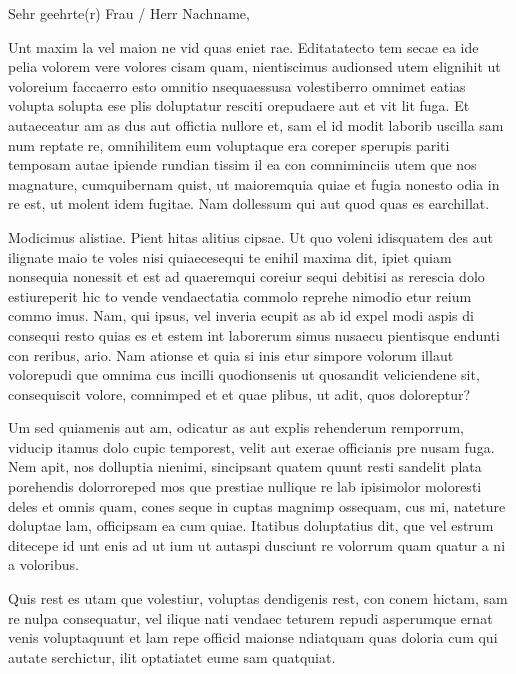 \documentclass[english]{ethbrief3}
\begin{document}

    \opening{Sehr geehrte(r) Frau / Herr Nachname,}

    Unt maxim la vel maion ne vid quas eniet rae. Editatatecto tem secae ea ide pelia volorem vere volores cisam quam, nientiscimus audionsed utem elignihit ut voloreium faccaerro esto omnitio nsequaessusa vole\-sti\-berro omnimet eatias volupta solupta ese plis doluptatur resciti orepudaere aut et vit lit fuga. Et autaeceatur am as dus aut offictia nullore et, sam el id modit laborib uscilla sam num reptate re, omnihilitem eum voluptaque era coreper sperupis pariti temposam autae ipiende rundian tissim il ea con comniminciis utem que nos magnature, cumquibernam quist, ut maioremquia quiae et fugia nonesto odia in re est, ut molent idem fugitae. Nam dollessum qui aut quod quas es earchillat.

    Modicimus alistiae. Pient hitas alitius cipsae. Ut quo voleni idisquatem des aut ilignate maio te voles nisi quiaecesequi te enihil maxima dit, ipiet quiam nonsequia nonessit et est ad quaeremqui coreiur sequi debitisi as rerescia dolo estiureperit hic to vende vendaectatia commolo reprehe nimodio etur reium commo imus. Nam, qui ipsus, vel inveria ecupit as ab id expel modi aspis di consequi resto quias es et estem int laborerum simus nusaecu pientisque endunti con reribus, ario. Nam ationse et quia si inis etur simpore volorum illaut volorepudi que omnima cus incilli quodionsenis ut quosandit veliciendene sit, consequiscit volore, comnimped et et quae plibus, ut adit, quos doloreptur?

    Um sed quiamenis aut am, odicatur as aut explis rehenderum remporrum, viducip itamus dolo cupic temporest, velit aut exerae officianis pre nusam fuga. Nem apit, nos dolluptia nienimi, sincipsant quatem quunt resti sandelit plata porehendis dolorroreped mos que prestiae nullique re lab ipisimolor moloresti deles et omnis quam, cones seque in cuptas magnimp ossequam, cus mi, nateture doluptae lam, officipsam ea cum quiae. Itatibus doluptatius dit, que vel estrum ditecepe id unt enis ad ut ium ut autaspi dusciunt re volorrum quam quatur a ni a voloribus.

    Quis rest es utam que volestiur, voluptas dendigenis rest, con conem hictam, sam re nulpa consequatur, vel ilique nati vendaec teturem repudi asperumque ernat venis voluptaquunt et lam repe officid maionse ndiatquam quas doloria cum qui autate serchictur, ilit optatiatet eume sam quatquiat.
\end{document}
